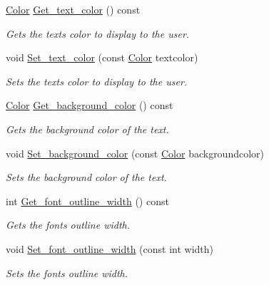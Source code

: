 \begin{DoxyCompactItemize}
\hyperlink{classjetfuel_1_1draw_1_1Color}{Color} \hyperlink{classjetfuel_1_1draw_1_1Text_a213dcf0fc15038eeaca73547d6c252db}{Get\+\_\+text\+\_\+color} () const
\begin{DoxyCompactList}\small\item\em Gets the text\textquotesingle{}s color to display to the user. \end{DoxyCompactList}\item 
void \hyperlink{classjetfuel_1_1draw_1_1Text_a7d04c15abedfeb98a1154d7e34d4d630}{Set\+\_\+text\+\_\+color} (const \hyperlink{classjetfuel_1_1draw_1_1Color}{Color} textcolor)
\begin{DoxyCompactList}\small\item\em Sets the text\textquotesingle{}s color to display to the user. \end{DoxyCompactList}\item 
\hyperlink{classjetfuel_1_1draw_1_1Color}{Color} \hyperlink{classjetfuel_1_1draw_1_1Text_a47ce107c33da03675d39e7550f7c44fc}{Get\+\_\+background\+\_\+color} () const
\begin{DoxyCompactList}\small\item\em Gets the background color of the text. \end{DoxyCompactList}\item 
void \hyperlink{classjetfuel_1_1draw_1_1Text_af1eaae041e0f763a95ca6e87aa7c3d7e}{Set\+\_\+background\+\_\+color} (const \hyperlink{classjetfuel_1_1draw_1_1Color}{Color} backgroundcolor)
\begin{DoxyCompactList}\small\item\em Sets the background color of the text. \end{DoxyCompactList}\item 
int \hyperlink{classjetfuel_1_1draw_1_1Text_a7d5f85f555e61f47a5a418399ba8e72b}{Get\+\_\+font\+\_\+outline\+\_\+width} () const
\begin{DoxyCompactList}\small\item\em Gets the font\textquotesingle{}s outline width. \end{DoxyCompactList}\item 
void \hyperlink{classjetfuel_1_1draw_1_1Text_ab8b3959fd37cb3cf9fd919ccdcaa09f3}{Set\+\_\+font\+\_\+outline\+\_\+width} (const int width)
\begin{DoxyCompactList}\small\item\em Sets the font\textquotesingle{}s outline width. \end{DoxyCompactList}\item 

\end{DoxyCompactItemize}

